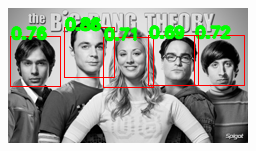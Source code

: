\documentclass[10pt]{article}
\begin{document}
\begin{figure}[!h]
    \centering
    \includegraphics[scale=0.7]{../figures/result_face_detection.png}
\end{figure}
\end{document}
